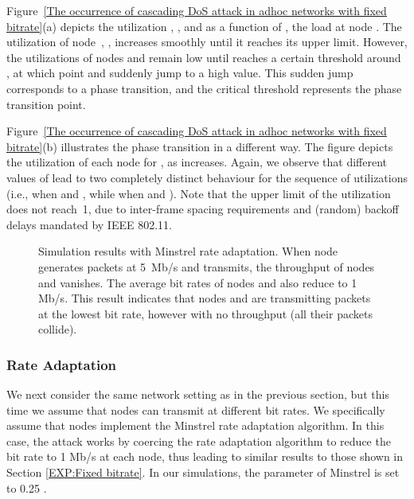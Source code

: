 \documentclass{IEEEtran}
\begin{document}
Figure~\ref{The occurrence of cascading DoS attack in adhoc networks  with fixed bitrate}(a) depicts the utilization
, , and  as a function of
, the load at node . The utilization of node~, , increases smoothly until it reaches its
upper limit. However, the
utilizations of nodes  and   remain low until  reaches a certain
threshold around , at which point  and  suddenly jump
to a high value.  This sudden jump corresponds to a phase transition, and the critical threshold represents the phase transition point.



Figure~\ref{The occurrence of cascading DoS attack in adhoc networks  with fixed bitrate}(b) illustrates the phase transition in a different way.
The figure depicts the
utilization of each node  for , as  increases. Again, we observe that different values of
 lead to two completely distinct behaviour for the sequence of
utilizations  (i.e.,  when  and , while
 when  and ). 
 Note that the upper limit of the utilization does not reach~1,
due to inter-frame spacing requirements  and (random) backoff delays mandated by IEEE 802.11. 


\begin{figure}[!t]
\centering
{}
\vfil
{}
\caption{Simulation results with Minstrel rate adaptation. When node
   generates packets at 5~Mb/s and transmits, the throughput of nodes  and 
  vanishes. The average bit rates of nodes  and  also
  reduce to 1 Mb/s. This result indicates that nodes  and
   are transmitting packets at the lowest bit rate,
  however with no throughput (all their packets collide).}
\label{Simulation Result with Minstrel Rate Adaptation}
\end{figure}


\subsubsection{Rate Adaptation}
\label{Rate Adaption}
We next consider the same network setting as in the previous section,
but this time we assume that nodes can transmit at different bit rates.
We specifically assume that nodes implement the Minstrel rate adaptation algorithm.
In this case, the attack works by coercing the rate adaptation algorithm to reduce the bit rate
to 1 Mb/s at each node, thus leading to similar results to those shown in Section
\ref{EXP:Fixed bitrate}. In our simulations, the parameter  of Minstrel is set to 0.25 \cite{xia2013evaluation}.
\end{document}
